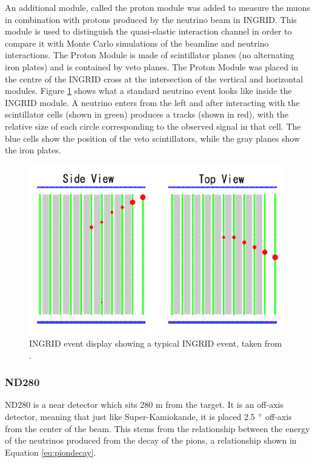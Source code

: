 An additional module, called the proton module was added to measure the muons in combination with protons produced by the neutrino beam in INGRID. This module is used to distinguish the quasi-elastic interaction channel in order to compare it with Monte Carlo simulations of the beamline and neutrino interactions. The Proton Module is made of scintillator planes (no alternating iron plates) and is contained by veto planes. The Proton Module was placed in the centre of the INGRID cross at the intersection of the vertical and horizontal modules. Figure \ref{fig:ingridevent} shows what a standard neutrino event looks like inside the INGRID module. A neutrino enters from the left and after interacting with the scintillator cells (shown in green) produces a tracks (shown in red), with the relative size of each circle corresponding to the observed signal in that cell. The blue cells show the position of the veto scintillators, while the gray planes show the iron plates. 

\begin{figure}
    \includegraphics[width=\textwidth]{Figures/ingridevent.png}
    \caption{INGRID event display showing a typical INGRID event, taken from \cite{t2kcollaborationT2KExperiment2011}.}
    \label{fig:ingridevent}
\end{figure}


\subsubsection{ND280}

ND280 is a near detector which sits 280 m from the target. It is an off-axis detector, meaning that just like Super-Kamiokande, it is placed 2.5 $\degree$ off-axis from the center of the beam. This stems from the relationship between the energy of the neutrinos produced from the decay of the pions, a relationship shown in Equation \ref{eq:piondecay}. 

